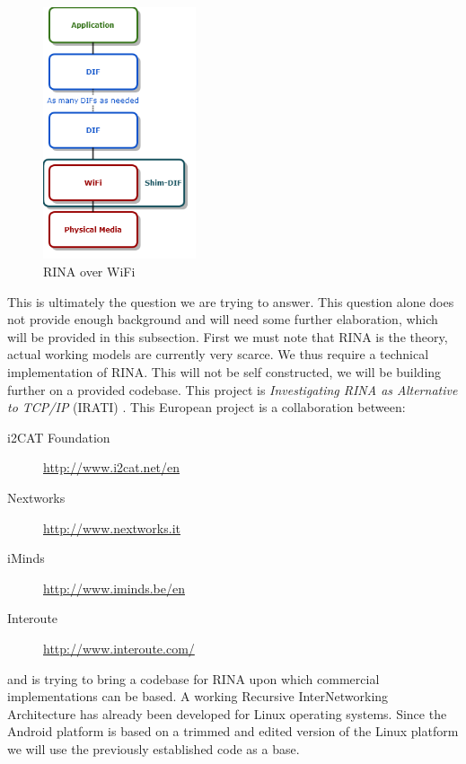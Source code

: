 \begin{figure}[H]
    \centering
    \includegraphics[width=0.4\textwidth]{figures/rinaoverwifi}
    \caption{RINA over WiFi} 
    \label{fig:rinaoverwifi}
\end{figure}
This is ultimately the question we are trying to answer. This question alone does not provide enough background and will need some further elaboration, which will be provided in this subsection. 
\npar
First we must note that RINA is the theory, actual working models are currently very scarce. We thus require a technical implementation of RINA. This will not be self constructed, we will be building further on a provided codebase. This project is \emph{Investigating RINA as Alternative to TCP/IP} (IRATI) \citep{vrijders2014prototyping}. This European project is a collaboration between: 
\begin{description}
	\item[i2CAT Foundation] \url{http://www.i2cat.net/en}
	\item[Nextworks] \url{http://www.nextworks.it}
	\item[iMinds] \url{http://www.iminds.be/en}
	\item[Interoute] \url{http://www.interoute.com/}
\end{description}
and is trying to bring a codebase for RINA upon which commercial implementations can be based. A working Recursive InterNetworking Architecture has already been developed for Linux operating systems. Since the Android platform is based on a trimmed and edited version of the Linux platform we will use the previously established code as a base. 
\npar

